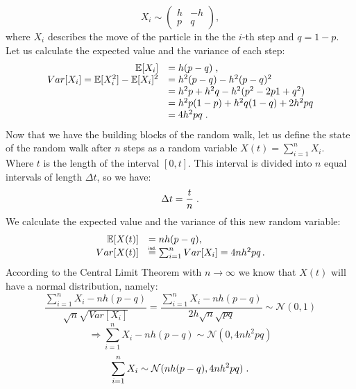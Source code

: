 \documentclass[times, utf8, diplomski]{fer}
\begin{document}
\begin{equation}
X_i \sim \left( \begin{array}{cc} h & -h \\
					p & q \end{array} \right),
\end{equation}
where $X_i$ describes the move of the particle in the the $i$-th step and $q=1-p$.
Let us calculate the expected value and the variance of each step:
\begin{equation}
	\begin{array}{rl}
									\mathbb{E}[X_i] &= h(p-q)\hspace{0.1cm}, \\
		Var[X_i] = \mathbb{E}[X_i^2] - \mathbb{E}[X_i]^2 &= h^2(p-q) - h^2(p-q)^2 \\
										&= h^2p + h^2q - h^2(p^2 - 2p1 + q^2)\\
										&= h^2p(1-p) + h^2q(1-q) + 2h^2pq\\
										&= 4h^2pq\hspace{0.1cm}. \\
	\end{array}
\end{equation}
Now that we have the building blocks of the random walk, let us define the state of the random walk after $n$ steps as a random variable $X(t) = \sum_{i=1}^n X_i$. Where $t$ is the length of the interval $[0,t]$. This interval is divided into $n$ equal intervals of length $\Delta t$, so we have:
\begin{equation}
	\Delta t = \frac{t}{n}\hspace{0.1cm}.
\end{equation}
We calculate the expected value and the variance of this new random variable:
\begin{equation}
	\begin{array}{rl}
		\mathbb{E}[X(t)] &= nh(p-q), \\
		Var[X(t)] &\indeq \sum_{i=1}^n Var[X_i] = 4nh^2pq \hspace{0.05cm}.\\
	\end{array}
\end{equation}
According to the Central Limit Theorem with $n \rightarrow \infty$ we know that $X(t)$ will have a normal distribution, namely:
$$ \frac{\sum_{i=1}^n X_i - nh(p-q)}{\sqrt{n}\sqrt{Var[X_i]}} = \frac{\sum_{i=1}^n X_i - nh(p-q)}{2h\sqrt{n}\sqrt{pq}} \sim \mathcal{N}(0,1) $$
$$ \Rightarrow \sum_{i=1}^n X_i - nh(p-q) \sim \mathcal{N}(0,4nh^2pq)$$
\begin{equation}
	\sum_{i=1}^n X_i \sim \mathcal{N}(nh(p-q), 4nh^2pq)\hspace{0.1cm}.
\end{equation}
\end{document}
